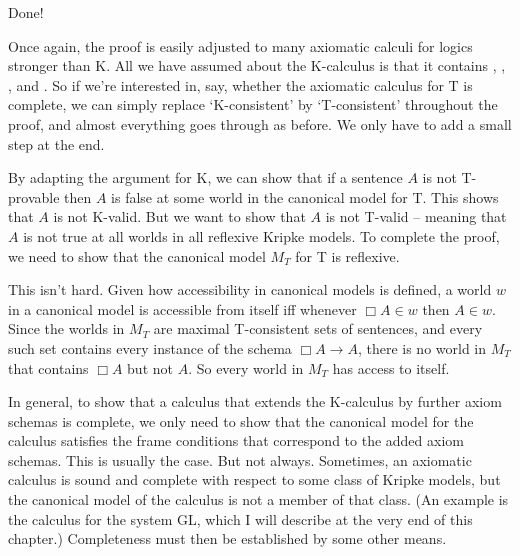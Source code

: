 Done!


Once again, the proof is easily adjusted to many axiomatic calculi for logics
stronger than K. All we have assumed about the K-calculus is that it contains
, , , and . So if we're interested in, say,
whether the axiomatic calculus for T is complete, we can simply replace
`K-consistent' by `T-consistent' throughout the proof, and almost everything
goes through as before. We only have to add a small step at the end.


By adapting the argument for K, we can show that if a sentence $A$ is not
T-provable then $A$ is false at some world in the canonical model for T. This
shows that $A$ is not K-valid. But we want to show that $A$ is not T-valid --
meaning that $A$ is not true at all worlds in all reflexive Kripke models. To
complete the proof, we need to show that the canonical model $M_{T}$ for T is
reflexive.

This isn't hard. Given how accessibility in canonical models is defined, a world
$w$ in a canonical model is accessible from itself iff whenever $\Box A \in w$
then $A \in w$. Since the worlds in $M_T$ are maximal T-consistent sets of
sentences, and every such set contains every instance of the  schema
$\Box A \to A$, there is no world in $M_T$ that contains $\Box A$ but not $A$.
So every world in $M_T$ has access to itself.

In general, to show that a calculus that extends the K-calculus by further axiom
schemas is complete, we only need to show that the canonical model for the
calculus satisfies the frame conditions that correspond to the added axiom
schemas. This is usually the case. But not always. Sometimes, an axiomatic
calculus is sound and complete with respect to some class of Kripke models, but
the canonical model of the calculus is not a member of that class. (An example is
the calculus for the system GL, which I will describe at the very end of this
chapter.) Completeness must then be established by some other means.


